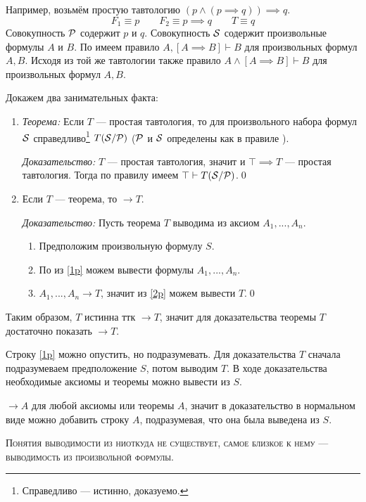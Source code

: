 Например, возьмём простую тавтологию $(p\land (p\implies q))\implies q$.
\[
	F_1\equiv p\qquad F_2\equiv p\implies q\qquad T\equiv q
\]
Совокупность $\mathcal P$ содержит $p$ и $q$.
Совокупность $\mathcal S$ содержит произвольные формулы $A$ и $B$.
По \taut{} имеем правило ${A,[A\implies B]\vdash B}$
для произвольных формул $A,B$.
Исходя из той же тавтологии также правило ${A\land[A\implies B]\vdash B}$
для произвольных формул $A,B$.

Докажем два занимательных факта:
\begin{enumerate}
	\item{}
	      {\it Теорема:}
	Если $T$ --- простая тавтология, то
	для произвольного набора формул $\mathcal S$ справедливо\footnote{
		Справедливо --- истинно, доказуемо.
	} $T(\mathcal S/\mathcal P)$
	($\mathcal P$ и $\mathcal S$ определены как в правиле \taut{}).

		{\it Доказательство:}
	$T$ --- простая тавтология, значит и
	${\top\implies T}$ --- простая тавтология. Тогда по правилу \taut{} имеем
	$\top\vdash T(\mathcal S/\mathcal P)$.\qed

	\item{}Если $T$ --- теорема, то $\to T$.

		{\it Доказательство:}
	Пусть теорема $T$ выводима из аксиом $A_1,...,A_{n}$.
	\begin{enumerate}[label=(\roman*)]
		\item{}\label{1p}Предположим произвольную формулу $S$.
		\item{}\label{2p}По \axiom{} из \ref{1p} можем вывести
		формулы $A_1,...,A_{n}$.
		\item{}\label{3p}$A_1,...,A_{n}\to T$, значит из \ref{2p} можем вывести $T$.\qed
	\end{enumerate}
\end{enumerate}

Таким образом, $T$ истинна ттк $\to T$, значит для доказательства теоремы $T$
достаточно показать $\to T$.

Строку \ref{1p} можно опустить, но подразумевать.
Для доказательства $T$ сначала подразумеваем предположение $S$, потом
выводим $T$. В ходе доказательства необходимые
аксиомы и теоремы можно вывести из $S$.

$\to A$ для любой аксиомы или теоремы $A$,
значит в доказательство в нормальном виде
можно добавить строку $A$, подразумевая, что она была выведена из $S$.

\textsc{Понятия выводимости из ниоткуда не существует,
	самое близкое к нему --- выводимость из произвольной формулы.}

